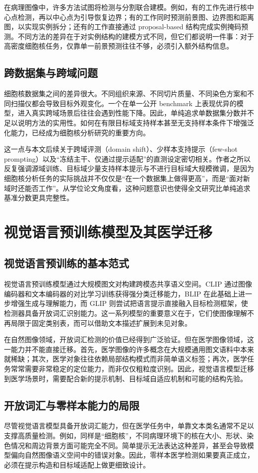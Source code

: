 在病理图像中，许多方法试图将检测与分割联合建模。例如，有的工作先进行核中心点检测，再以中心点为引导恢复边界；有的工作同时预测前景图、边界图和距离图，以实现实例拆分；还有的工作直接通过 proposal-based 结构完成实例掩码预测。不同方法的差异在于对实例结构的建模方式不同，但它们都说明一件事：对于高密度细胞核任务，仅靠单一前景预测往往不够，必须引入额外结构信息。

\subsection{跨数据集与跨域问题}
细胞核数据集之间的差异很大。不同组织来源、不同切片质量、不同染色方案和不同扫描仪都会导致目标外观变化。一个在单一公开 benchmark 上表现优异的模型，进入真实跨域场景后往往会遇到性能下降。因此，单纯追求单数据集分数并不足以说明方法的实用性。如何在有限目标域支持样本甚至无支持样本条件下增强泛化能力，已经成为细胞核分析研究的重要方向。

这一点与本文后续关于跨域评测（domain shift）、少样本支持提示（few-shot prompting）以及“冻结主干、仅通过提示适配”的直测设定密切相关。作者之所以反复强调源域训练、目标域少量支持样本提示与不进行目标域大规模微调，是因为细胞核分析任务的实际挑战并不仅仅是“在一个数据集上做得更高”，而是“面对新域时还能否工作”。从学位论文角度看，这种问题意识也使得全文研究比单纯追求基准分数更具完整性。

\section{视觉语言预训练模型及其医学迁移}

\subsection{视觉语言预训练的基本范式}
视觉语言预训练模型通过大规模图文对构建跨模态共享语义空间。CLIP 通过图像编码器和文本编码器的对比学习训练获得强分类迁移能力，BLIP 在此基础上进一步增强生成与理解能力，而 GLIP 则尝试把语言提示直接融入目标检测框架，使检测器具备开放词汇识别能力。这一系列模型的重要意义在于，它们使图像理解不再局限于固定类别表，而可以借助文本描述扩展到未见对象。

在自然图像领域，开放词汇检测的价值已经得到广泛验证。但在医学图像领域，这一能力并不能直接迁移。首先，医学图像的许多概念在大规模通用图文语料中本来就稀缺；其次，医学对象往往依赖局部结构模式而非简单语义标签；再次，医学任务常常需要非常稳定的定位能力，而非仅仅粗粒度识别。因此，视觉语言模型迁移到医学场景时，需要配合新的提示机制、目标域自适应机制和可能的结构先验。

\subsection{开放词汇与零样本能力的局限}
尽管视觉语言模型具备开放词汇能力，但在医学任务中，单靠文本类名通常不足以支撑高质量检测。例如，同样是“细胞核”，不同病理环境下的核在大小、形状、染色情况和周边背景方面可能完全不同。简单提示无法表达这种差异，甚至会导致模型偏向自然图像语义空间中的错误对象。因此，零样本医学检测如果要真正成立，必须在提示构造和目标域适配上做更细致设计。

